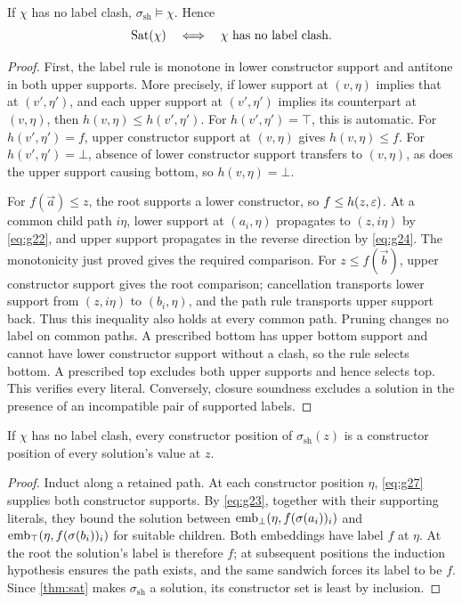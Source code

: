 \begin{theorem}\label{thm:sat}
If $\chi$ has no label clash, $\sigma_{\mathrm{sh}}\models\chi$. Hence
\begin{equation}\label{eq:g26}
 \operatorname{Sat}(\chi)\quad\Longleftrightarrow\quad
 \chi\text{ has no label clash}.
\end{equation}
\end{theorem}
\begin{proof}
First, the label rule is monotone in lower constructor support and
antitone in both upper supports. More precisely, if lower support at
$(v,\eta)$ implies that at $(v',\eta')$, and each upper support at
$(v',\eta')$ implies its counterpart at $(v,\eta)$, then
$h(v,\eta)\le h(v',\eta')$. For $h(v',\eta')=\top$, this is
automatic. For $h(v',\eta')=f$, upper constructor support at $(v,\eta)$ gives
$h(v,\eta)\le f$. For $h(v',\eta')=\bot$, absence of lower constructor support
transfers to $(v,\eta)$, as does the upper support causing bottom, so
$h(v,\eta)=\bot$.

For $f(\vec a)\le z$, the root supports a lower constructor, so
$f\le h(z,\varepsilon)$. At a common child path $i\eta$, lower support at
$(a_i,\eta)$ propagates to $(z,i\eta)$ by \eqref{eq:g22}, and upper
support propagates in the reverse direction by \eqref{eq:g24}.
The monotonicity just proved gives the required comparison. For
$z\le f(\vec b)$, upper constructor support gives the root comparison;
cancellation transports lower support from $(z,i\eta)$ to $(b_i,\eta)$,
and the path rule transports upper support back. Thus this inequality
also holds at every common path. Pruning changes no label on common paths.
A prescribed bottom has upper bottom support and cannot have lower
constructor support without a clash, so the rule selects bottom.
A prescribed top excludes both upper supports and hence selects top.
This verifies every literal. Conversely, closure soundness excludes a
solution in the presence of an incompatible pair of supported labels.
\end{proof}

\begin{lemma}\label{lem:minimal-shape}
If $\chi$ has no label clash, every constructor position of
$\sigma_{\mathrm{sh}}(z)$ is a constructor position of every solution's
value at $z$.
\end{lemma}
\begin{proof}
Induct along a retained path. At each constructor position $\eta$,
\eqref{eq:g27} supplies both constructor supports. By \eqref{eq:g23},
together with their supporting literals, they bound the solution
between $\operatorname{emb}_\bot(\eta,f(\sigma(a_i))_i)$ and
$\operatorname{emb}_\top(\eta,f(\sigma(b_i))_i)$ for suitable children. Both
embeddings have label $f$ at $\eta$. At the root the solution's label is therefore $f$; at subsequent
positions the induction hypothesis ensures the path exists, and the
same sandwich forces its label to be $f$. Since \cref{thm:sat} makes
$\sigma_{\mathrm{sh}}$ a solution, its constructor set is least by inclusion.
\end{proof}

